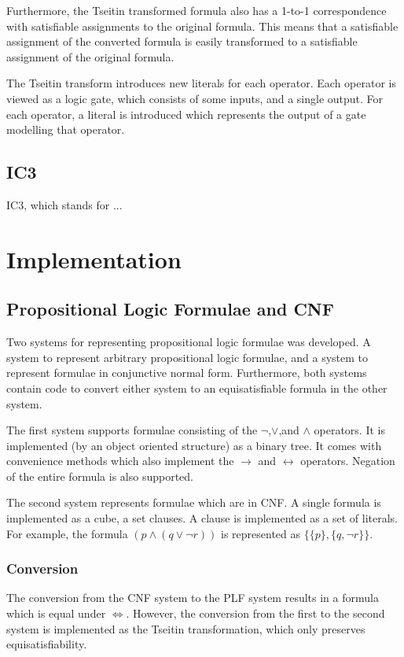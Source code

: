 \documentclass[a4paper]{article}
\begin{document}
Furthermore, the Tseitin transformed formula also has a 1-to-1 correspondence with satisfiable assignments to the original formula. This means that a satisfiable assignment of the converted formula is easily transformed to a satisfiable assignment of the original formula.

The Tseitin transform introduces new literals for each operator. Each operator is viewed as a logic gate, which consists of some inputs, and a single output. For each operator, a literal is introduced which represents the output of a gate modelling that operator.


\subsection{IC3}
IC3, which stands for ... %

\section{Implementation}
\subsection{Propositional Logic Formulae and CNF}
Two systems for representing propositional logic formulae was developed. A system to represent arbitrary propositional logic formulae, and a system to represent formulae in conjunctive normal form. Furthermore, both systems contain code to convert either system to an equisatisfiable formula in the other system.

The first system supports formulae consisting of the $\lnot$,$\lor$,and $\land$ operators. It is implemented (by an object oriented structure) as a binary tree. It comes with convenience methods which also implement the $\rightarrow$ and $\leftrightarrow$ operators. Negation of the entire formula is also supported.

The second system represents formulae which are in CNF. A single formula is implemented as a cube, a set clauses. A clause is implemented as a set of literals. For example, the formula $(p \land (q \lor \lnot r))$ is represented as $\{\{p\},\{q,\lnot r\}\}$.
\subsubsection{Conversion}
The conversion from the CNF system to the PLF system results in a formula which is equal under $\Leftrightarrow$. However, the conversion from the first to the second system is implemented as the Tseitin transformation, which only preserves equisatisfiability.
\end{document}
